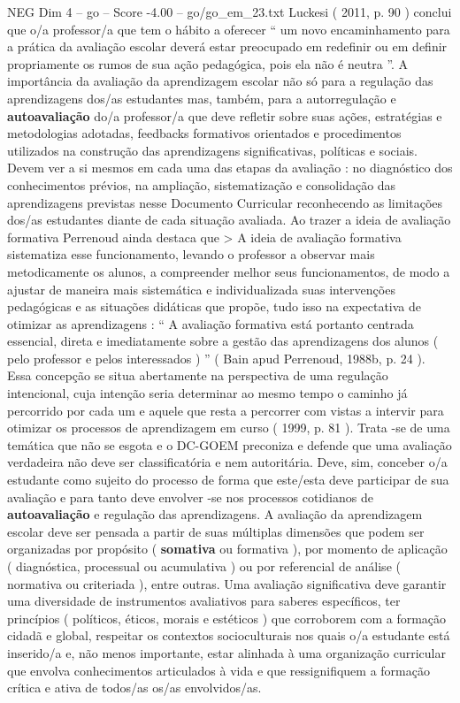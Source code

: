 \begin{textsample}{NEG Dim 4 – go – Score -4.00 – go/go\_em\_23.txt}
Luckesi ( 2011, p. 90 ) conclui que o/a professor/a que tem o hábito a oferecer “ um novo encaminhamento para a prática da avaliação escolar deverá estar preocupado em redefinir ou em definir propriamente os rumos de sua ação pedagógica, pois ela não é neutra ”.
A importância da avaliação da aprendizagem escolar não só para a regulação das aprendizagens dos/as estudantes mas, também, para a autorregulação e \textbf{autoavaliação} do/a professor/a que deve refletir sobre suas ações, estratégias e metodologias adotadas, feedbacks formativos orientados e procedimentos utilizados na construção das aprendizagens significativas, políticas e sociais.
Devem ver a si mesmos em cada uma das etapas da avaliação : no diagnóstico dos conhecimentos prévios, na ampliação, sistematização e consolidação das aprendizagens previstas nesse Documento Curricular reconhecendo as limitações dos/as estudantes diante de cada situação avaliada.
Ao trazer a ideia de avaliação formativa Perrenoud ainda destaca que > A ideia de avaliação formativa sistematiza esse funcionamento, levando o professor a observar mais metodicamente os alunos, a compreender melhor seus funcionamentos, de modo a ajustar de maneira mais sistemática e individualizada suas intervenções pedagógicas e as situações didáticas que propõe, tudo isso na expectativa de otimizar as aprendizagens : “ A avaliação formativa está portanto centrada essencial, direta e imediatamente sobre a gestão das aprendizagens dos alunos ( pelo professor e pelos interessados ) ” ( Bain apud Perrenoud, 1988b, p. 24 ).
Essa concepção se situa abertamente na perspectiva de uma regulação intencional, cuja intenção seria determinar ao mesmo tempo o caminho já percorrido por cada um e aquele que resta a percorrer com vistas a intervir para otimizar os processos de aprendizagem em curso ( 1999, p. 81 ).
Trata -se de uma temática que não se esgota e o DC-GOEM preconiza e defende que uma avaliação verdadeira não deve ser classificatória e nem autoritária.
Deve, sim, conceber o/a estudante como sujeito do processo de forma que este/esta deve participar de sua avaliação e para tanto deve envolver -se nos processos cotidianos de \textbf{autoavaliação} e regulação das aprendizagens.
A avaliação da aprendizagem escolar deve ser pensada a partir de suas múltiplas dimensões que podem ser organizadas por propósito ( \textbf{somativa} ou formativa ), por momento de aplicação ( diagnóstica, processual ou acumulativa ) ou por referencial de análise ( normativa ou criteriada ), entre outras.
Uma avaliação significativa deve garantir uma diversidade de instrumentos avaliativos para saberes específicos, ter princípios ( políticos, éticos, morais e estéticos ) que corroborem com a formação cidadã e global, respeitar os contextos socioculturais nos quais o/a estudante está inserido/a e, não menos importante, estar alinhada à uma organização curricular que envolva conhecimentos articulados à vida e que ressignifiquem a formação crítica e ativa de todos/as os/as envolvidos/as.

\end{textsample}
